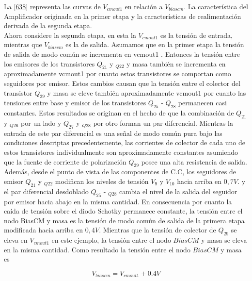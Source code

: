\documentclass[12pt,a4paper,final,headinclude,footinclude,BCOR5mm]{scrartcl}
\begin{document}
La \ref{638} representa las curvas de $V_{cmout1}$ en relación a $V_{biascm}$. La característica del Amplificador originada en la primer etapa y la características de realimentación  derivada de la segunda etapa.\\

Ahora considere la segunda etapa, en esta la $V_{cmout1}$ es la tensión de entrada, mientras que $V_{biascm}$ es la de salida. Asumamos que en la primer etapa la tensión de salida de modo común se incrementa en vcmout1 . Entonces la tensión  entre los emisores de los transistores $Q_{21}$ y $_{Q22}$ y masa también se incrementa en aproximadamente vcmout1 por cuanto estos transistores se comportan como seguidores por emisor. Estos cambios causan que la tensión entre el colector del transistor $Q_{29}$ y masa se eleve también aproximadamente vcmout1 por cuanto las tensiones entre base y emisor de los transistores $Q_{25}$ - $Q_{28}$ permanecen casi constantes. Estos resultados se originan en el hecho de que  la combinación de $Q_{21}$ y $_{Q26}$ por un lado y $Q_{27}$ y $_{Q28}$ por otro forman un par diferencial. Mientras la entrada de este par diferencial es una señal de modo común pura bajo las condiciones descriptas precedentemente, las corrientes de colector de cada uno de estos transistores individualmente son aproximadamente constantes asumiendo que la fuente de corriente de polarización $Q_{29}$ posee una alta resistencia de salida. Además, desde el punto de vista de las componentes de C.C, los seguidores de emisor $Q_{21}$ y $_{Q22}$ modifican los niveles de tensión  $V_{9}$ y $V_{10}$ hacia arriba en $0,7 V$. y el par diferencial desdoblado $Q_{25}$ - $_{Q28}$ cambia el nivel de la salida del seguidor por emisor hacia abajo en la misma cantidad. En consecuencia por cuanto la caída de tensión sobre el diodo Schotky permanece constante, la tensión entre el nodo BiasCM y masa es la tensión de modo común de salida de la primera etapa modificada hacia arriba en $0,4 V$. Mientras que la tensión de colector de $Q_{29}$ se eleva en $V_{cmout1}$ en este ejemplo, la tensión entre el nodo $BiasCM$ y masa se eleva en la misma cantidad. Como resultado la tensión entre el nodo $BiasCM$ y masa es

$$V_{biascm} = V_{cmout1} + 0.4V$$
\end{document}
